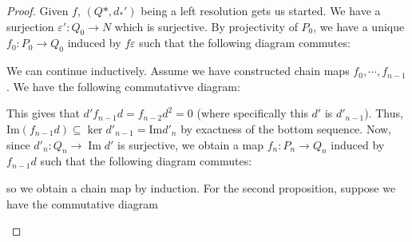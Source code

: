 \documentclass[12pt,reqno]{amsart}
\numberwithin{theorem}{section}
\theoremstyle{definition}
\theoremstyle{remark}
\numberwithin{equation}{section}
\newcommand{\im}{\operatorname{Im}}
\renewcommand{\Im}{\text{Im}}
\theoremstyle{definition}
\begin{document}
\begin{proof}
    Given $f$, $(Q*,d_*')$ being a left resolution gets us started. We have a surjection $\varepsilon': Q_0 \rightarrow N$ which is surjective. By projectivity of $P_0$, we have a unique $f_0:P_0 \rightarrow Q_0$ induced by $f\varepsilon$ such that the following diagram commutes:
    \begin{center}
    \end{center}
    We can continue inductively. Assume we have constructed chain maps $f_0 ,\cdots,f_{n-1}$. We have the following commutativve diagram:
    \begin{center}
    \end{center}
    This gives that $d'f_{n-1}d = f_{n-2}d^2 = 0$ (where specifically this $d'$ is $d'_{n-1}$). Thus, $\Im(f_{n-1}d) \subseteq \ker d'_{n-1} = \Im d'_{n}$ by exactness of the bottom sequence. Now, since $d'_n:Q_n\rightarrow \im d'$ is surjective, we obtain a map $f_n : P_n \rightarrow Q_n$ induced by $f_{n-1}d$ such that the following diagram commutes:
    \begin{center}
    \end{center}
    so we obtain a chain map by induction. For the second proposition, suppose we have the commutative diagram
    \begin{center}
\end{center}
\end{proof}
\end{document}
